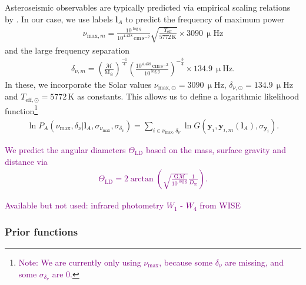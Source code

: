 \documentclass[
  journal=pasa,
  manuscript=research-paper, %
  year=2021,
  volume=37,
]{cup-journal}
\newcommand{\SB}[1]{{\textcolor{purple}{#1}}}
\newcommand{\muHz}{\,\mathrm{\upmu Hz}} %
\begin{document}
Asteroseismic observables are typically predicted via empirical scaling relations by \citet{Kjeldsen1995}. In our case, we use labels ${\boldsymbol{l}_A}$ to predict the frequency of maximum power
\begin{align}
    \nu_{\text{max},m} = \frac{10^{\log g}}{10^{4.438}\,\mathrm{cm\,s^{-2}}} \sqrt{\frac{T_\text{eff}}{5772\,\mathrm{K}}} \times 3090\muHz
\end{align}
and the large frequency separation
\begin{align}
    \delta_{\nu,m} = \left( \frac{\mathcal{M}}{\mathrm{M_\odot}} \right)^{\frac{-1}{4}} \left( \frac{10^{4.438}\,\mathrm{cm\,s^{-2}}}{10^{\log g}} \right)^{-\frac{3}{4}} \times 134.9\muHz.
\end{align}
In these, we incorporate the Solar values $\nu_{\text{max},\odot} = 3090\muHz$, $\delta_{\nu,\odot} = 134.9\muHz$ and $T_{\mathrm{eff},\odot} = 5772\,\mathrm{K}$ as constants. This allows us to define a logarithmic likelihood function\footnote{\SB{Note: We are currently only using $\nu_\text{max}$, because some $\delta_\nu$ are missing, and some $\sigma_{\delta_\nu}$ are 0.}}
\begin{align} \label{eq:likelihood_asteroseismic}
    \ln P_A (\nu_\text{max}, \delta_\nu \vert {\boldsymbol{l}_A}, \sigma_{\nu_\text{max}}, \sigma_{\delta_\nu}) = 
    \sum_{i \in {\nu_\text{max},\delta_\nu}}
    \ln G({\boldsymbol{y}_i}, {\boldsymbol{y}_{i,m}} (\boldsymbol{l}_A), \sigma_{\boldsymbol{y}_i}).
\end{align}

\SB{We predict the angular diameters $\Theta_\text{LD}$ based on the mass, surface gravity and distance via
\begin{align}
    \Theta_\text{LD} = 2 \arctan \left( \sqrt{\frac{\mathrm{G} \mathcal{M}}{10^{\log g}}} \frac{1}{D_\varpi} \right).
\end{align}}

\SB{Available but not used: infrared photometry $W_1$ - $W_4$ from WISE \citep{Cutri2013}}

\subsubsection{Prior functions} \label{subsubsec:prior}
\end{document}
